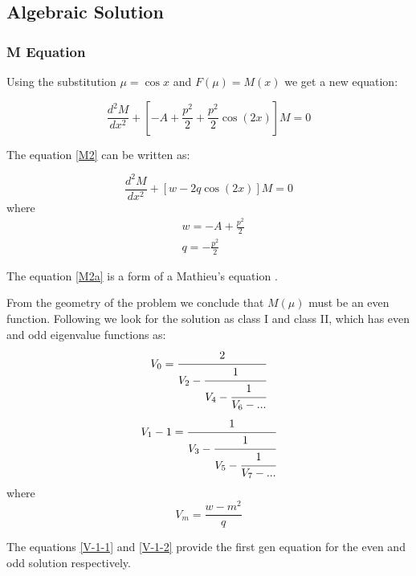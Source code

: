 \subsection{Algebraic Solution}

\subsubsection{ M Equation }

Using the substitution $ \mu  = \cos x$ and $ F(\mu) = M(x) $ we get a new equation:

\begin{equation}\label{M2}
\frac{d^2 M}{d x^2} + \left[-A + \frac{p^2}{2} + \frac{p^2}{2}\cos(2x) \right]M = 0 
\end{equation}

The equation \eqref{M2} can be written as:

\begin{equation}\label{M2a}
\frac{d^2 M}{d x^2} + \left[w - 2q\cos(2x)\right]M = 0
\end{equation}
where
\begin{equation}
\begin{split}
& w = - A + \frac{p^2}{2} \\[.7em]
& q = - \frac{p^2}{2}
\end{split}
\end{equation}

The equation \eqref{M2a} is a form of a  Mathieu's equation \cite{Mathieu2}. 

From the geometry of the problem we conclude that $ M(\mu) $ must be an even function.  Following \cite{Mathieu4} we look for the solution as class I and class II, which has even and odd eigenvalue functions as:
\begin{equation}
\begin{split}
V_0 = \cfrac{2}{V_2 - \cfrac{1}{V_4 - \cfrac{1}{V_6 - ...}}}\label{V-1-1}
\end{split}
\end{equation}
\begin{equation}
\begin{split}
V_1 - 1 = \cfrac{1}{V_3 - \cfrac{1}{V_5 - \cfrac{1}{V_7 - ...}}}\label{V-1-2}
\end{split}
\end{equation}
where 
\begin{equation}
V_m = \frac{w - m^2}{q}
\end{equation}

The equations \ref{V-1-1} and \ref{V-1-2} provide the first gen equation for the even and odd solution respectively.

